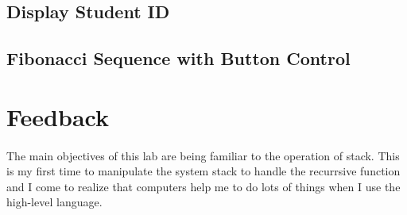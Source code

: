 \subsection{Display Student ID}
\subsection{Fibonacci Sequence with Button Control}
\section{Feedback}
\paragraph{}
The main objectives of this lab are being familiar to the operation of stack. This is my first time to manipulate the system stack to handle the recurrsive function and I come to realize that computers help me to do lots of things when I use the high-level language.
